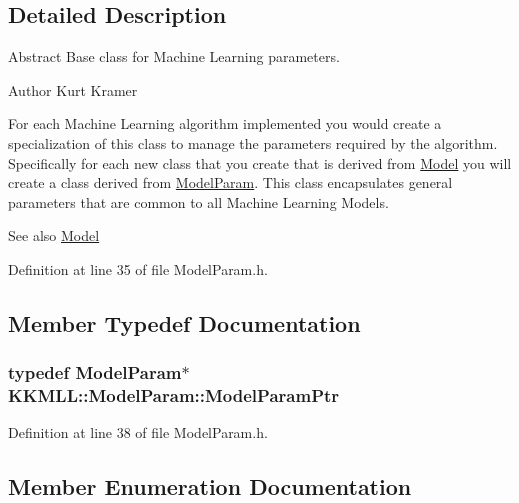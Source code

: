 \subsection{Detailed Description}
Abstract Base class for Machine Learning parameters. 

\begin{DoxyAuthor}{Author}
Kurt Kramer
\end{DoxyAuthor}
For each Machine Learning algorithm implemented you would create a specialization of this class to manage the parameters required by the algorithm. Specifically for each new class that you create that is derived from \textquotesingle{}\hyperlink{class_k_k_m_l_l_1_1_model}{Model}\textquotesingle{} you will create a class derived from \textquotesingle{}\hyperlink{class_k_k_m_l_l_1_1_model_param}{Model\+Param}\textquotesingle{}. This class encapsulates general parameters that are common to all Machine Learning Models. \begin{DoxySeeAlso}{See also}
\hyperlink{class_k_k_m_l_l_1_1_model}{Model} 
\end{DoxySeeAlso}


Definition at line 35 of file Model\+Param.\+h.



\subsection{Member Typedef Documentation}
\subsubsection[{\texorpdfstring{Model\+Param\+Ptr}{ModelParamPtr}}]{\setlength{\rightskip}{0pt plus 5cm}typedef {\bf Model\+Param}$\ast$ {\bf K\+K\+M\+L\+L\+::\+Model\+Param\+::\+Model\+Param\+Ptr}}\hypertarget{class_k_k_m_l_l_1_1_model_param_a9207769b1dd342da66939ceffa4324cf}{}\label{class_k_k_m_l_l_1_1_model_param_a9207769b1dd342da66939ceffa4324cf}


Definition at line 38 of file Model\+Param.\+h.



\subsection{Member Enumeration Documentation}
